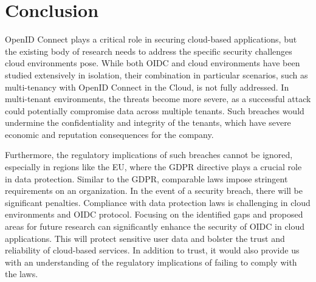 \section{Conclusion}
OpenID Connect plays a critical role in securing cloud-based applications, but the existing body of research needs to address the specific security challenges cloud environments pose. While both OIDC and cloud environments have been studied extensively in isolation, their combination in particular scenarios, such as multi-tenancy with OpenID Connect in the Cloud, is not fully addressed. In multi-tenant environments, the threats become more severe, as a successful attack could potentially compromise data across multiple tenants. Such breaches would undermine the confidentiality and integrity of the tenants, which have severe economic and reputation consequences for the company.

Furthermore, the regulatory implications of such breaches cannot be ignored, especially in regions like the EU, where the GDPR directive plays a crucial role in data protection. Similar to the GDPR, comparable laws impose stringent requirements on an organization. In the event of a security breach, there will be significant penalties. Compliance with data protection laws is challenging in cloud environments and OIDC protocol. Focusing on the identified gaps and proposed areas for future research can significantly enhance the security of OIDC in cloud applications. This will protect sensitive user data and bolster the trust and reliability of cloud-based services. In addition to trust, it would also provide us with an understanding of the regulatory implications of failing to comply with the laws.




 



